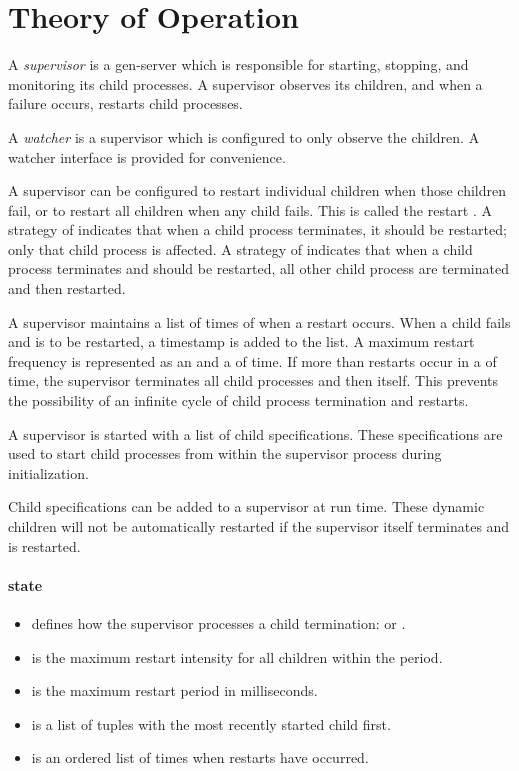 \section {Theory of Operation}

A \emph{supervisor} is a gen-server which is
responsible for starting, stopping, and monitoring its child
processes. A supervisor observes its children, and when a failure
occurs, restarts child processes.

A \emph{watcher} is a supervisor which is configured to only observe
the children. A watcher interface is provided for convenience.

A supervisor can be configured to restart individual children when
those children fail, or to restart all children when any child
fails. This is called the restart . A strategy of
 indicates that when a child process terminates,
it should be restarted; only that child process is affected. A
strategy of  indicates that when a child process
terminates and should be restarted, all other child process are
terminated and then restarted.

A supervisor maintains a list of times of when a restart occurs. When
a child fails and is to be restarted, a timestamp is added to the
 list. A maximum restart frequency is represented as an
 and a  of time. If more than
 restarts occur in a  of time, the
supervisor terminates all child processes and then itself. This
prevents the possibility of an infinite cycle of child process
termination and restarts.

A supervisor is started with a list of child specifications. These
specifications are used to start child processes from within the
supervisor process during initialization.

Child specifications can be added to a supervisor at run time. These
dynamic children will not be automatically restarted if the supervisor
itself terminates and is restarted.

\paragraph*{state}
\begin{itemize}
  \item {} defines how the supervisor processes a child
    termination:  or .
  \item {} is the maximum restart intensity for all
    children within the period.
  \item {} is the maximum restart period in milliseconds.
  \item {} is a list of  tuples with
    the most recently started child first.
  \item {} is an ordered list of times when restarts
    have occurred.
\end{itemize}

